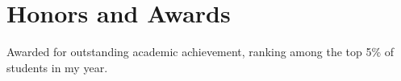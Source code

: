 \section{Honors and Awards}
{Awarded for outstanding academic achievement, ranking among the top 5\% of students in my year.}
